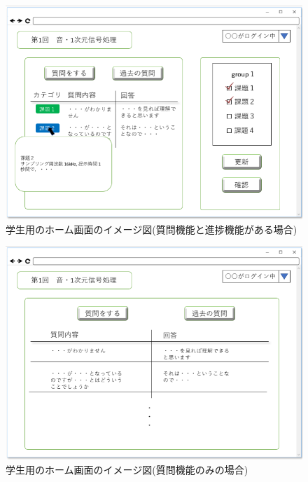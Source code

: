 \begin{figure}[phtbp]
  \begin{center}
    \includegraphics[width=0.8\linewidth,clip]{./img/28.png}
    \caption{学生用のホーム画面のイメージ図(質問機能と進捗機能がある場合)}\label{fig:28}
  \end{center}
\end{figure}

\begin{figure}[phtbp]
  \begin{center}
    \includegraphics[width=0.8\linewidth,clip]{./img/29.png}
    \caption{学生用のホーム画面のイメージ図(質問機能のみの場合)}\label{fig:29}
  \end{center}
\end{figure}




